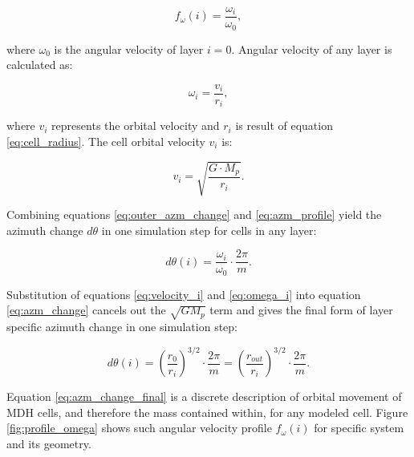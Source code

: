 \begin{equation} \label{eq:azm_profile}
f_{\omega}(i) = \frac{\omega_i}{\omega_0},
\end{equation}

where $\omega_0$ is the angular velocity of layer $i=0$. Angular velocity of any layer is calculated as: 

\begin{equation} \label{eq:omega_i}
\omega_i = \frac{v_i}{r_i},
\end{equation}

where $v_i$ represents the orbital velocity and $r_i$ is result of equation \ref{eq:cell_radius}. The cell orbital velocity $v_i$ is:

\begin{equation} \label{eq:velocity_i}
v_i = \sqrt{\frac{G \cdot M_p}{r_i}}.
\end{equation}

Combining equations \ref{eq:outer_azm_change} and \ref{eq:azm_profile} yield the azimuth change $d\theta$ in one simulation step for cells in any layer:

\begin{equation} \label{eq:azm_change}
d\theta(i) = \frac{\omega_i}{\omega_0} \cdot \frac{2\pi}{m}.
\end{equation}

Substitution of equations \ref{eq:velocity_i} and \ref{eq:omega_i} into equation \ref{eq:azm_change} cancels out the $\sqrt{GM_p}$ term and gives the final form of layer specific azimuth change in one simulation step:

\begin{equation} \label{eq:azm_change_final}
d\theta(i) = \left(\frac{r_{0}}{r_i}\right)^{3/2} \cdot \frac{2\pi}{m} = \left(\frac{r_{out}}{r_i}\right)^{3/2} \cdot \frac{2\pi}{m}.
\end{equation}

Equation \ref{eq:azm_change_final} is a discrete description of orbital movement of MDH cells, and therefore the mass contained within, for any modeled cell. Figure \ref{fig:profile_omega} shows such angular velocity profile $f_{\omega}(i)$ for specific system and its geometry.

